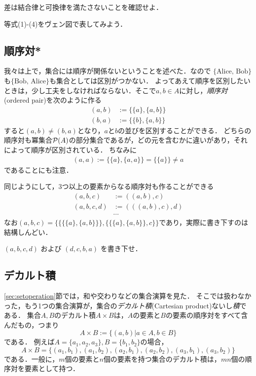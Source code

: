 \documentclass[11pt,a4paper]{jsarticle}
\begin{document}
\begin{exercise}
差は結合律と可換律を満たさないことを確認せよ．
\end{exercise}


\begin{exercise}
等式(1)-(4)をヴェン図で表してみよう．
\end{exercise}


\subsection{順序対*}
我々は上で，集合には順序が関係ないということを述べた．なので $\{\text{Alice, Bob}\}$も$\{\text{Bob, Alice}\}$も集合としては区別がつかない．
よってあえて順序を区別したいときは，少し工夫をしなければならない．そこで$a, b \in A$に対し，\emph{順序対}(ordered pair)を次のように作る
\begin{align*}
 (a, b) &:= \{ \{a\}, \{a, b\} \} \\
 (b, a) &:= \{ \{b\}, \{a, b\} \} 
\end{align*}
すると$(a,b) \neq (b,a)$となり，$a$と$b$の並びを区別することができる．
どちらの順序対も冪集合$\mathcal{P}(A)$の部分集合であるが，どの元を含むかに違いがあり，それによって順序が区別されている．
ちなみに
\begin{align*}
 (a, a) := \{ \{a\}, \{a, a\} \} = \{ \{a\} \} \neq a 
\end{align*}
であることにも注意．

同じようにして，3つ以上の要素からなる順序対も作ることができる
\begin{align*}
 (a, b, c) &:= ((a,b), c) \\
 (a, b, c, d) &:= (((a,b), c), d) \\
&\cdots
\end{align*}
なお$ (a, b, c) = \{\{\{\{a\}, \{a,b\}\}\}, \{\{\{a\}, \{a,b\}\}, c\}\}$であり，実際に書き下すのは結構しんどい．

\begin{exercise}
$(a,b,c,d)$ および $(d,c,b,a)$ を書き下せ．
\end{exercise} 

 
\subsection{デカルト積}
\ref{sec:setoperation}節では，和や交わりなどの集合演算を見た．
そこでは扱わなかった，もう1つの集合演算が，集合の\emph{デカルト積}(Cartesian product)ないし\emph{積}である．
集合$A, B$のデカルト積$A \times B$は，$A$の要素と$B$の要素の順序対をすべて含んだもの，つまり
\[
 A \times B := \{ (a, b) | a \in A, b \in B\}
\]
である．
例えば$A = \{a_1, a_2, a_3\}, B = \{b_1, b_2\}$の場合，
\[
A \times B = \{(a_1, b_1), (a_1, b_2), (a_2, b_1), (a_2, b_2), (a_3, b_1), (a_3, b_2)\}
\]
である．一般に，$m$個の要素と$n$個の要素を持つ集合のデカルト積は，$mn$個の順序対を要素として持つ．
\end{document}
